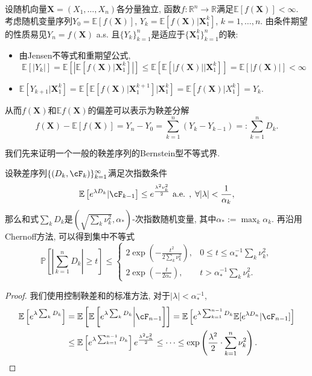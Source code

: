 设随机向量$\bm{X} = (X_1, \dots, X_n)$各分量独立, 函数$f \colon \mathbb{R}^n \to \mathbb{R}$满足$\mathbb{E}[f(\bm{X})] < \infty$. 
考虑随机变量序列$Y_0 = \mathbb{E}[f(\bm{X})]$, $Y_k = \mathbb{E}[f(\bm{X})|\bm{X}_1^k]$, $k = 1, \dots, n$. 
由条件期望的性质易见$Y_n = f(\bm{X})$ a.s. 且$\{Y_k\}_{k=1}^n$是适应于$\{\bm{X}_1^k\}_{k=1}^n$的鞅: 
\begin{itemize}
	\item 由Jensen不等式和重期望公式, 
		\begin{equation*}
			\mathbb{E}[|Y_k|]
			= \mathbb{E}\left[\left|\mathbb{E}[f(\bm{X})|\bm{X}_1^k]\right|\right] 
			\leq \mathbb{E}\left[\mathbb{E}[|f(\bm{X})||\bm{X}_1^k] \right]
			= \mathbb{E}[|f(\bm{X})|]
			< \infty
		\end{equation*}
	\item $\mathbb{E}[Y_{k+1}|\bm{X}_1^k] = \mathbb{E}\left[\mathbb{E}[f(\bm{X})|\bm{X}_1^{k+1}] \big|\bm{X}_1^k\right] = \mathbb{E}[f(\bm{X}) | X_1^k] = Y_k$. 
\end{itemize}
从而$f(\bm{X})$和$\mathbb{E}f(\bm{X})$的偏差可以表示为鞅差分解
\begin{equation*}
	f(\bm{X}) - \mathbb{E}[f(\bm{X})] 
	= Y_n - Y_0 
	= \sum_{k=1}^n (Y_k - Y_{k-1})
	=: \sum_{k=1}^n D_k.
\end{equation*}

我们先来证明一个一般的鞅差序列的Bernstein型不等式界. 
\begin{lemma}[Azuma]
	设鞅差序列$\{(D_k, \cF_k)\}_{k=1}^{\infty}$满足次指数条件
	\begin{equation*}
		\mathbb{E}\left[ e^{\lambda D_k} | \cF_{k-1} \right] 
		\leq e^{\frac{\lambda^2 \nu_k^2}{2}} \text{ a.e. },\; \forall |\lambda| < \frac{1}{\alpha_k}, 
	\end{equation*}
	那么和式$\sum_k D_k$是$\left( \sqrt{\sum_k \nu_k^2}, \alpha_* \right)$-次指数随机变量, 其中$\alpha_* := \max_k \alpha_k$.  
	再沿用Chernoff方法, 可以得到集中不等式
	\begin{equation*}
		\mathbb{P} \left[ \left| \sum_{k=1}^n D_k \right| \geq t \right] \leq 
		\begin{cases}
			2 \exp\left( -\frac{t^2}{2 \sum_k \nu_k^2} \right), & 0 \leq t \leq \alpha_*^{-1} \sum_k \nu_k^2, \\
			2 \exp\left(- \frac{t}{2 \alpha_*}\right), & t > \alpha_*^{-1} \sum_k \nu_k^2.
		\end{cases}
	\end{equation*}
\end{lemma}
\begin{proof}
	我们使用控制鞅差和的标准方法, 对于$|\lambda| < \alpha_*^{-1}$, 
	\begin{align*}
		\mathbb{E}\left[ e^{\lambda \sum_k D_k} \right]
		&= \mathbb{E}\left[ \mathbb{E}\left[ e^{\lambda \sum_k D_k} \bigg| \cF_{n-1} \right] \right] 
		= \mathbb{E}\left[ e^{\lambda \sum_{k=1}^{n-1} D_k} \mathbb{E}[e^{\lambda D_n} | \cF_{n-1}] \right] \\
		&\leq \mathbb{E}\left[ e^{\lambda \sum_{k=1}^{n-1} D_k} \right]  e^{\frac{\lambda^2 \nu_n^2}{2}} 
		\leq \dots
		\leq \exp\left(\frac{\lambda^2}{2} \cdot  \sum_{k=1}^n \nu_k^2 \right).
	\end{align*}
\end{proof} 

